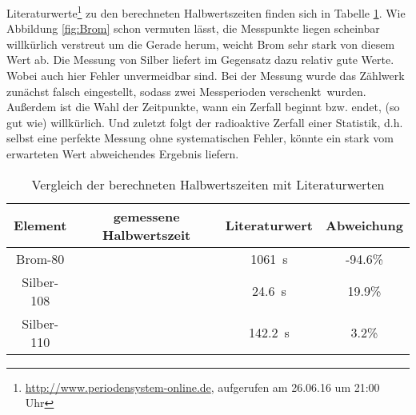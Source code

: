 Literaturwerte\footnote{\url{http://www.periodensystem-online.de}, aufgerufen am 26.06.16 um 21:00 Uhr} zu den berechneten Halbwertszeiten finden sich in Tabelle \ref{tab:Lit}. Wie Abbildung \ref{fig:Brom} schon vermuten lässt, die Messpunkte liegen scheinbar willkürlich verstreut um die Gerade herum, weicht Brom sehr stark von diesem Wert ab. Die Messung von Silber liefert im Gegensatz dazu relativ gute Werte. Wobei auch hier Fehler unvermeidbar sind. Bei der Messung wurde das Zählwerk zunächst falsch eingestellt, sodass zwei Messperioden \glqq verschenkt\grqq\ wurden. Außerdem ist die Wahl der Zeitpunkte, wann ein Zerfall beginnt bzw. endet, (so gut wie) willkürlich. Und zuletzt folgt der radioaktive Zerfall einer Statistik, d.h. selbst eine perfekte Messung ohne systematischen Fehler, könnte ein stark vom erwarteten Wert abweichendes Ergebnis liefern.
\begin{table}[h!]
\centering
\caption{Vergleich der berechneten Halbwertszeiten mit Literaturwerten}
\label{tab:Lit}
\begin{tabular}{cccc}
	\toprule
	Element & gemessene Halbwertszeit & Literaturwert & Abweichung \\
	\midrule
	Brom-80 &  & \SI{1061}{\second} & -94.6\% \\
	Silber-108 &  & \SI{24.6}{\second} & 19.9\% \\
	Silber-110 &  & \SI{142.2}{\second} & 3.2\% \\
	\bottomrule
\end{tabular}
\end{table}
